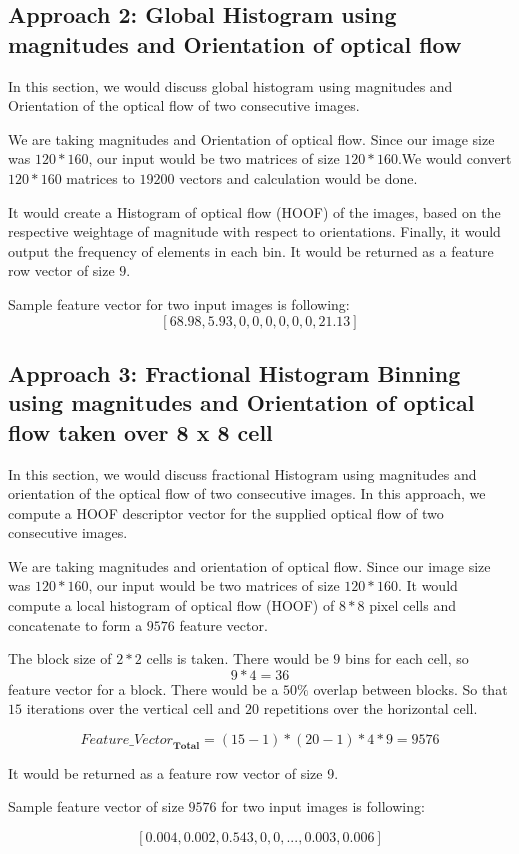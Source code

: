 \subsection{Approach 2: Global Histogram using magnitudes and Orientation of optical flow}
In this section, we would discuss global histogram using magnitudes and Orientation of the optical flow of two consecutive images.

We are taking magnitudes and Orientation of optical flow. Since our image size was $120 \ast 160$, our input would be two matrices of size $120 \ast 160$.We would convert $120 \ast 160$ matrices to $19200$ vectors and calculation would be done.

It would create a Histogram of optical flow (HOOF) of the images, based on the respective weightage of magnitude with respect to orientations.
 Finally, it would output the frequency of elements in each bin. It would be returned as a feature row vector of size $9$.
 
 Sample feature vector for two input images is following:
\[[68.98, 5.93, 0, 0, 0, 0, 0, 0,21.13]\]





\subsection{Approach 3: Fractional Histogram Binning using  magnitudes and Orientation of optical flow taken over 8 x 8 cell}

In this section, we would discuss fractional Histogram using magnitudes and orientation of the optical flow of two consecutive images.
In this approach, we compute a HOOF descriptor vector for the supplied optical flow of two consecutive images.

We are taking magnitudes and orientation of optical flow. Since our image size was $120 \ast 160$, our input would be two matrices of size $120 \ast 160$. It would compute a local histogram of optical flow (HOOF) of $8 \ast 8$ pixel cells and concatenate to form a $9576$ feature vector.

The block size of $2 \ast 2$ cells is taken. There would be $9$ bins for each cell, \newline
so 
\[9 \ast 4 = 36\]
feature vector for a block. There would be a $50\%$ overlap between blocks. So that $15$ iterations over the vertical cell and $20$ repetitions over the horizontal cell.

\[{Feature\_Vector}_{\textbf{Total}} = (15 - 1) \ast (20 - 1 ) \ast 4 \ast 9 = 9576\]

It would be returned as a feature row vector of size 9.

 
 Sample feature vector of size $9576$ for two input images is following:
 
\[[0.004,0.002,0.543,0,0,...,0.003,0.006]\]
 
